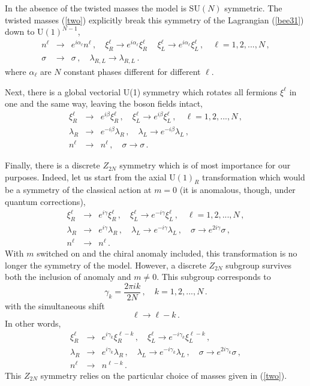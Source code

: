\documentclass[epsfig,12pt]{article}
\def\beq{\begin{equation}}
\def\eeq{\end{equation}}
\def\beqn{\begin{eqnarray}}
\def\eeqn{\end{eqnarray}}
\def\beqn{\begin{eqnarray}}
\def\eeqn{\end{eqnarray}}
\def\beq{\begin{equation}}
\def\eeq{\end{equation}}
\begin{document}
{ In the absence of the twisted masses
the model is SU$(N)$ symmetric. The twisted masses (\ref{two}) explicitly break this symmetry 
of the Lagrangian (\ref{bee31}) down to U$(1)^{N-1}$,
\beqn
n^\ell&\to& e^{i\alpha_\ell}n^\ell\,,\quad \xi^\ell_R \to e^{i\alpha_\ell}\xi^\ell_R\,
\quad \xi^\ell_L \to e^{i\alpha_\ell}\xi^\ell_L\,,\quad \ell=1,2, ..., N\,,
\nonumber\\[2mm]
\sigma
&\to&
 \sigma\,,\quad \lambda_{R,L}\to \lambda_{R,L}\,.
 \label{appe9}
\eeqn
where $\alpha_\ell$ are $N$ constant phases different for different $\ell$. 

Next, there is a global vectorial U(1) symmetry which rotates all fermions $\xi^\ell$
in one and the same way, leaving the boson fields intact,
\beqn
\xi^\ell_R 
&\to& 
e^{i\beta}\xi^\ell_R\,, \quad
 \xi^\ell_L \to e^{i\beta}\xi^\ell_L\,,\quad \ell=1,2, ..., N\,,
\nonumber\\[2mm]
\lambda_R 
&\to&
 e^{-i\beta}\lambda_R\,,\quad 
\lambda_L \to e^{-i\beta}\lambda_L\,,
\nonumber\\[2mm]
n^\ell &\to& n^\ell\,,\quad \sigma\to\sigma\,.
\label{appeten}
\eeqn

Finally, there is a discrete $Z_{2N}$ symmetry which is of most importance for our purposes.
Indeed, let us start from the axial U$(1)_R$ transformation which would be a symmetry
of the classical action at $m=0$ 
 (it is anomalous, though, under quantum corrections),
\beqn
\xi^\ell_R 
&\to& 
e^{i\gamma}\xi^\ell_R\,, \quad
 \xi^\ell_L \to e^{-i\gamma }\xi^\ell_L\,,\quad \ell=1,2, ..., N\,,
 \nonumber\\[2mm]
 \lambda_R 
&\to&
 e^{i\gamma}\lambda_R\,,\quad 
 \lambda_L \to e^{-i\gamma}\lambda_L\,,\quad \sigma \to e^{2i\gamma}\sigma\,,
\nonumber\\[2mm]
n^\ell
&\to&
 n^\ell\,.
 \label{appe11}
\eeqn
With $m$ switched on and the chiral anomaly included, this transformation 
is no longer the symmetry of the model. However, a discrete $Z_{2N}$ subgroup survives both the inclusion of anomaly and $m\neq 0$. This subgroup corresponds to
\beq
\gamma_k =\frac{2\pi i k}{2N}\,,\quad k= 1,2, ..., N\,.
\label{appe12}
\eeq
with the simultaneous shift
\beq
\ell\to \ell - k\,.
\label{appe13}
\eeq
In other words,
\beqn
\xi^\ell_R 
&\to& 
e^{i\gamma_k}\xi^{\ell-k}_R\,, \quad
 \xi^\ell_L \to e^{-i\gamma_k }\xi^{\ell-k}_L\,, 
 \nonumber\\[2mm]
 \lambda_R 
&\to&
 e^{i\gamma_k}\lambda_R\,,\quad 
 \lambda_L \to e^{-i\gamma_k}\lambda_L\,,\quad \sigma \to e^{2i\gamma_k}\sigma\,,
 \nonumber\\[2mm]
 n^\ell &\to & n^{\ell-k}\,.
 \label{bee35}
\eeqn
This $Z_{2N}$ symmetry  relies on the particular choice of masses 
given in (\ref{two}).

}
\end{document}
